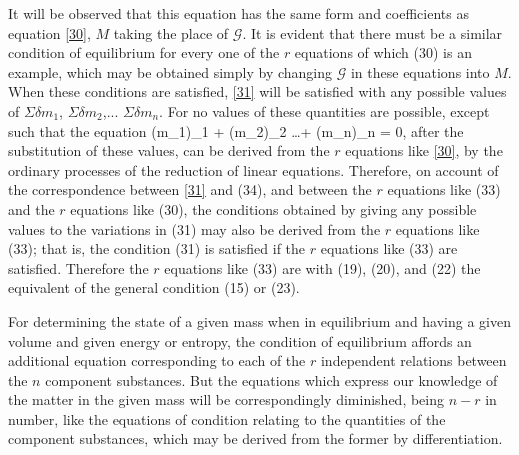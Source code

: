 \documentclass[12pt]{article}
\begin{document}
It will be observed that this equation has the same form and coefficients as equation \ref{30}, $M$ taking the place of $\mathcal{G}$. It is evident that there must be a similar condition of equilibrium for every one of the $r$ equations of which (30) is an example, which may be obtained simply by changing $\mathcal{G}$ in these equations into $M$. When these conditions are satisfied, \ref{31} will be satisfied with any possible values of $\Sigma \delta m_1$, $\Sigma \delta m_2$,... $\Sigma \delta m_n$. For no values of these quantities are possible, except such that the equation
\eqs (\Sigma \delta m_1)_1 + (\Sigma \delta m_2)_2 \dots + (\Sigma \delta m_n)_n = 0,     \label{34} \eqe
after the substitution of these values, can be derived from the $r$ equations like \ref{30}, by the ordinary processes of the reduction of linear equations. Therefore, on account of the correspondence between \ref{31} and (34), and between the $r$ equations like (33) and the $r$ equations like (30), the conditions obtained by giving any possible values to the variations in (31) may also be derived from the $r$ equations like (33); that is, the condition (31) is satisfied if the $r$ equations like (33) are satisfied. Therefore the $r$ equations like (33) are with (19), (20), and (22) the equivalent of the general condition (15) or (23).

For determining the state of a given mass when in equilibrium and having a given volume and given energy or entropy, the condition of equilibrium affords an additional equation corresponding to each of the $r$ independent relations between the $n$ component substances. But the equations which express our knowledge of the matter in the given mass will be correspondingly diminished, being $n-r$ in number, like the equations of condition relating to the quantities of the component substances, which may be derived from the former by differentiation.
\end{document}
